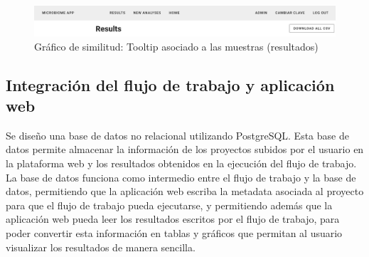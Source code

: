 \begin{figure}[H]
    \includegraphics[width=1\linewidth]{images/app/donwload_button.png}

    \caption{Gráfico de similitud: Tooltip asociado a las muestras (resultados)}
    \label{fig:app-download-button}
\end{figure}



\subsection{Integración del flujo de trabajo y aplicación web}

Se diseño una base de datos no relacional utilizando PostgreSQL.
Esta base de datos permite almacenar la información de los proyectos subidos por el usuario en la plataforma web y los resultados obtenidos en la ejecución del flujo de trabajo.
La base de datos funciona como intermedio entre el flujo de trabajo y la base de datos, permitiendo que la aplicación web escriba la metadata asociada al proyecto para que el flujo de trabajo pueda ejecutarse, y permitiendo además que la aplicación web pueda leer los resultados escritos por el flujo de trabajo, para poder convertir esta información en tablas y gráficos que permitan al usuario visualizar los resultados de manera sencilla.

